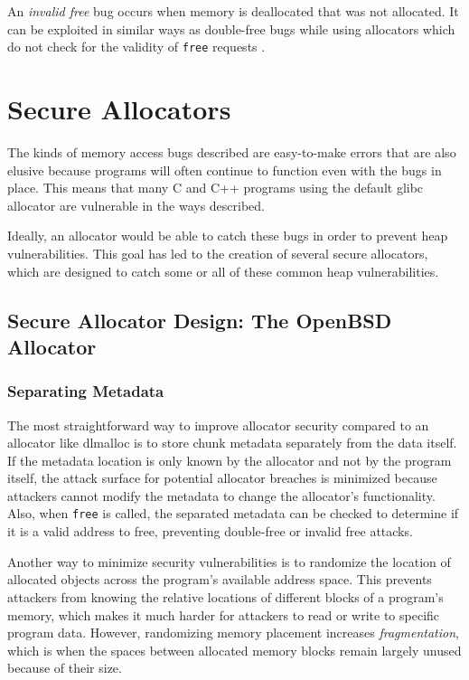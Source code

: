 \documentclass[conference]{IEEEtran}
\begin{document}
An \emph{invalid free} bug occurs when memory is deallocated that was not allocated.
It can be exploited in similar ways as double-free bugs while using allocators which do not check for the validity of \verb|free| requests \cite{freeguard}.

\section{Secure Allocators}

The kinds of memory access bugs described are easy-to-make errors that are also elusive because programs will often continue to function even with the bugs in place.
This means that many C and C++ programs using the default glibc allocator are vulnerable in the ways described.

Ideally, an allocator would be able to catch these bugs in order to prevent heap vulnerabilities.
This goal has led to the creation of several secure allocators, which are designed to catch some or all of these common heap vulnerabilities.

\subsection{Secure Allocator Design: The OpenBSD Allocator}

\subsubsection{Separating Metadata}

The most straightforward way to improve allocator security compared to an allocator like dlmalloc is to store chunk metadata separately from the data itself.
If the metadata location is only known by the allocator and not by the program itself, the attack surface for potential allocator breaches is minimized because attackers cannot modify the metadata to change the allocator's functionality.
Also, when \verb|free| is called, the separated metadata can be checked to determine if it is a valid address to free, preventing double-free or invalid free attacks.

Another way to minimize security vulnerabilities is to randomize the location of allocated objects across the program's available address space.
This prevents attackers from knowing the relative locations of different blocks of a program's memory, which makes it much harder for attackers to read or write to specific program data.
However, randomizing memory placement increases \emph{fragmentation}, which is when the spaces between allocated memory blocks remain largely unused because of their size.
\end{document}

